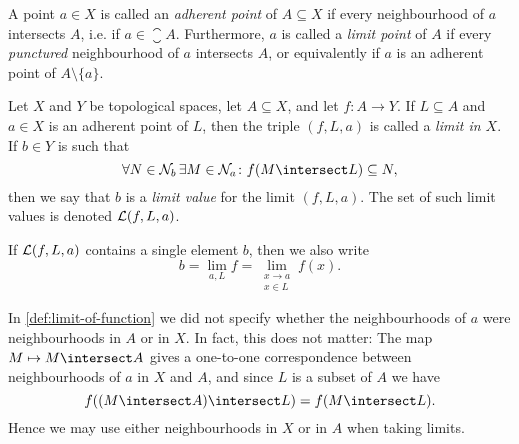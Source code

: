 \documentclass[article, a4paper, 11pt, oneside]{memoir}
\numberwithin{equation}{chapter}
\begin{document}
A point $a \in X$ is called an \emph{adherent point} of $A \subseteq X$ if every neighbourhood of $a$ intersects $A$, i.e. if $a \in \closure{A}$. Furthermore, $a$ is called a \emph{limit point} of $A$ if every \emph{punctured} neighbourhood of $a$ intersects $A$, or equivalently if $a$ is an adherent point of $A \setminus \{a\}$.

\begin{definition}
    \label{def:limit-of-function}
    Let $X$ and $Y$ be topological spaces, let $A \subseteq X$, and let $f \colon A \to Y$. If $L \subseteq A$ and $a \in X$ is an adherent point of $L$, then the triple $(f,L,a)$ is called a \emph{limit in $X$}. If $b \in Y$ is such that
    \begin{equation*}
        \forall N \in \nhoods{b}\,
            \exists M \in \nhoods{a} \colon
            f(M \intersect L) \subseteq N,
    \end{equation*}
    then we say that $b$ is a \emph{limit value} for the limit $(f,L,a)$. The set of such limit values is denoted $\mathcal{L}(f,L,a)$.

    If $\mathcal{L}(f,L,a)$ contains a single element $b$, then we also write
    \begin{equation*}
        b
            = \lim_{a, L} f
            = \lim_{\substack{x \to a \\ x \in L}} f(x).
    \end{equation*}



\end{definition}

\begin{remark}
    \label{rem:limit-neighbourhoods}
    In \cref{def:limit-of-function} we did not specify whether the neighbourhoods of $a$ were neighbourhoods in $A$ or in $X$. In fact, this does not matter: The map $M \mapsto M \intersect A$ gives a one-to-one correspondence between neighbourhoods of $a$ in $X$ and $A$, and since $L$ is a subset of $A$ we have
    \begin{equation*}
        f((M \intersect A) \intersect L) = f(M \intersect L).
    \end{equation*}
    Hence we may use either neighbourhoods in $X$ or in $A$ when taking limits.
\end{remark}
\end{document}
